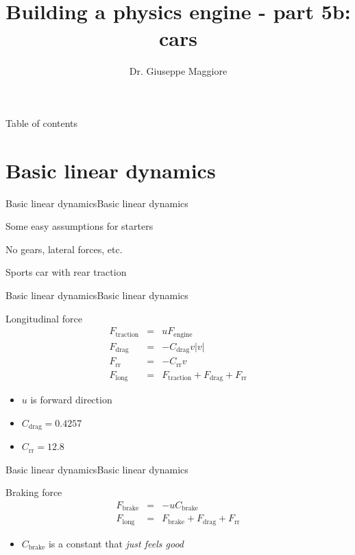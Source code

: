 \documentclass{beamer}
\title{Building a physics engine - part 5b: cars}
\author{Dr. Giuseppe Maggiore}
\institute{NHTV University of Applied Sciences \\ 
Breda, Netherlands}
\date{}
\begin{document}
\maketitle

\begin{frame}{Table of contents}
\tableofcontents
\end{frame}

\section{Basic linear dynamics}
\begin{slide}{Basic linear dynamics}{Basic linear dynamics}{
\item Some easy assumptions for starters
\item No gears, lateral forces, etc.
\item Sports car with rear traction
}\end{slide}

\begin{slide}{Basic linear dynamics}{Basic linear dynamics}{
\item Longitudinal force
\begin{eqnarray}
F_{\text{traction}} &=& u F_{\text{engine}} \\
F_{\text{drag}} &=& - C_{\text{drag}} v |v| \\
F_{\text{rr}} &=& - C_{\text{rr}} v \\
F_{\text{long}} &=& F_{\text{traction}} + F_{\text{drag}} + F_{\text{rr}}
\end{eqnarray}
\begin{itemize}
\item $u$ is forward direction
\item $C_{\text{drag}} = 0.4257$
\item $C_{\text{rr}} = 12.8$
\end{itemize}
}\end{slide}

\begin{slide}{Basic linear dynamics}{Basic linear dynamics}{
\item Braking force
\begin{eqnarray}
F_{\text{brake}} &=& -u C_{\text{brake}} \\
F_{\text{long}} &=& F_{\text{brake}} + F_{\text{drag}} + F_{\text{rr}}
\end{eqnarray}
\begin{itemize}
\item $C_{\text{brake}}$ is a constant that \textit{just feels good}
\end{itemize}
}\end{slide}
\end{document}
